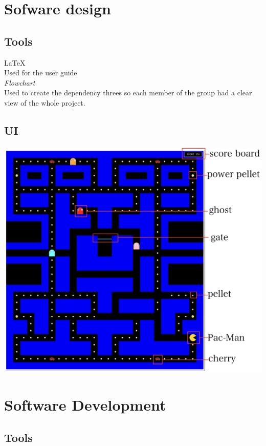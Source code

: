 \documentclass{article}
\begin{document}
 \section{Sofware design}
 \subsection{Tools}
 \hspace{0.5cm}\LaTeX \\
 Used for the user guide\\
 
 \textit{Flowchart}\\
 Used to create the dependency threes so each member of the group had a clear view of the whole project.
 

 \subsection{UI}
\includegraphics{./images/user_interface.png}

 \section{Software Development}
 \subsection{Tools}
\end{document}
